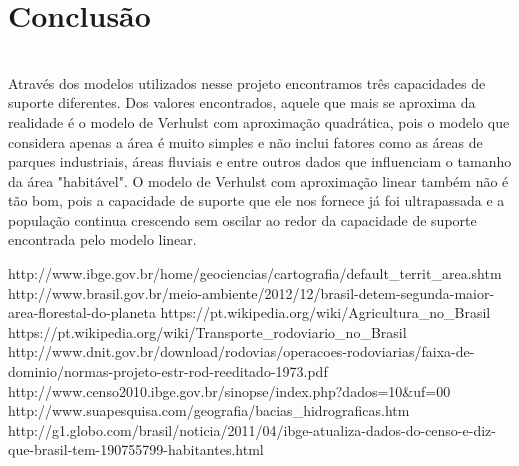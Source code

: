 \documentclass[a4paper]{article}
\begin{document}
\section{Conclus\~{a}o}
\\
Atrav\'{e}s dos modelos utilizados nesse projeto encontramos tr\^{e}s capacidades de suporte diferentes. Dos valores encontrados, aquele que mais se aproxima da realidade \'{e} o modelo de Verhulst com aproxima\c{c}\~{a}o quadr\'{a}tica, pois o modelo que considera apenas a \'{a}rea \'{e} muito simples e n\~{a}o inclui fatores como as \'{a}reas de parques industriais, \'{a}reas fluviais e entre outros dados que influenciam o tamanho da \'{a}rea "habit\'{a}vel". O modelo de Verhulst com aproxima\c{c}\~{a}o linear tamb\'{e}m n\~{a}o \'{e} t\~{a}o bom, pois a capacidade de suporte que ele nos fornece j\'{a} foi ultrapassada e a popula\c{c}\~{a}o continua crescendo sem oscilar ao redor da capacidade de suporte encontrada pelo modelo linear.


\begin{thebibliography}{99}
 http://www.ibge.gov.br/home/geociencias/cartografia/default\_territ\_area.shtm
 http://www.brasil.gov.br/meio-ambiente/2012/12/brasil-detem-segunda-maior-area-florestal-do-planeta 
 https://pt.wikipedia.org/wiki/Agricultura\_no\_Brasil
 https://pt.wikipedia.org/wiki/Transporte\_rodoviario\_no\_Brasil
 http://www.dnit.gov.br/download/rodovias/operacoes-rodoviarias/faixa-de-dominio/normas-projeto-estr-rod-reeditado-1973.pdf
 http://www.censo2010.ibge.gov.br/sinopse/index.php?dados=10\&uf=00
 http://www.suapesquisa.com/geografia/bacias\_hidrograficas.htm
 http://g1.globo.com/brasil/noticia/2011/04/ibge-atualiza-dados-do-censo-e-diz-que-brasil-tem-190755799-habitantes.html 
\end{thebibliography}
\end{document}
